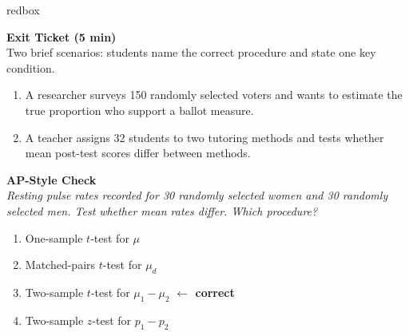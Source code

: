 \documentclass[10pt]{article}
\begin{document}
\begin{skillbox}{redbox}
\begin{minipage}[t]{0.48\linewidth}
    \textbf{Exit Ticket (5 min)}\\
    Two brief scenarios: students name the correct procedure and state one key condition.
    \begin{enumerate}
        \item A researcher surveys 150 randomly selected voters and wants to estimate the
              true proportion who support a ballot measure.
        \item A teacher assigns 32 students to two tutoring methods and tests whether mean
              post-test scores differ between methods.
    \end{enumerate}
\end{minipage}
\hfill
\begin{minipage}[t]{0.48\linewidth}
    \textbf{AP-Style Check}\\
    \textit{Resting pulse rates recorded for 30 randomly selected women and 30 randomly selected
    men. Test whether mean rates differ. Which procedure?}
    \begin{enumerate}[label=(\Alph*)]
        \item One-sample $t$-test for $\mu$
        \item Matched-pairs $t$-test for $\mu_d$
        \item Two-sample $t$-test for $\mu_1-\mu_2$ \textcolor{keyred}{\textbf{$\leftarrow$ correct}}
        \item Two-sample $z$-test for $p_1-p_2$
    \end{enumerate}
\end{minipage}
\end{skillbox}
\end{document}
